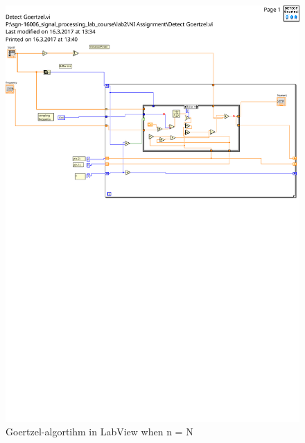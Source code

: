 \begin{figure}[H]
  \centering
  \includegraphics[width=0.8\linewidth]{detect_goertzel_false}
  \caption{Goertzel-algortihm in LabView when n = N}
\label{fig:GoertzelFalse}
\end{figure}

